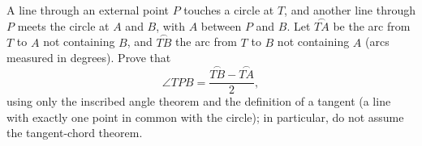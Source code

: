 A line through an external point $P$ touches a circle at $T$, and another line through $P$ meets the circle at $A$ and $B$, with $A$ between $P$ and $B$. Let $\overset{\frown}{TA}$ be the arc from $T$ to $A$ not containing $B$, and $\overset{\frown}{TB}$ the arc from $T$ to $B$ not containing $A$ (arcs measured in degrees). Prove that
\[
\angle TPB=\dfrac{\overset{\frown}{TB}-\overset{\frown}{TA}}{2},
\]
using only the inscribed angle theorem and the definition of a tangent (a line with exactly one point in common with the circle); in particular, do not assume the tangent-chord theorem.
